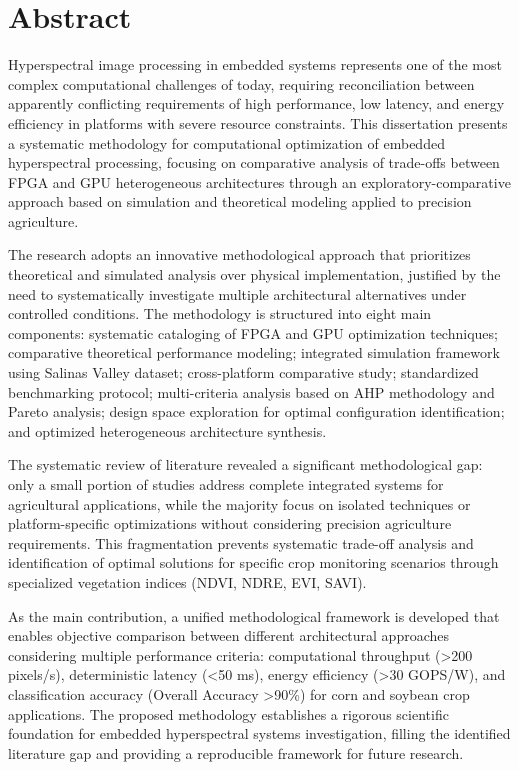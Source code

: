 
\chapter*{Abstract}

Hyperspectral image processing in embedded systems represents one of the most complex computational challenges of today, requiring reconciliation between apparently conflicting requirements of high performance, low latency, and energy efficiency in platforms with severe resource constraints. This dissertation presents a systematic methodology for computational optimization of embedded hyperspectral processing, focusing on comparative analysis of trade-offs between FPGA and GPU heterogeneous architectures through an exploratory-comparative approach based on simulation and theoretical modeling applied to precision agriculture.

The research adopts an innovative methodological approach that prioritizes theoretical and simulated analysis over physical implementation, justified by the need to systematically investigate multiple architectural alternatives under controlled conditions. The methodology is structured into eight main components: systematic cataloging of FPGA and GPU optimization techniques; comparative theoretical performance modeling; integrated simulation framework using Salinas Valley dataset; cross-platform comparative study; standardized benchmarking protocol; multi-criteria analysis based on AHP methodology and Pareto analysis; design space exploration for optimal configuration identification; and optimized heterogeneous architecture synthesis.

The systematic review of literature revealed a significant methodological gap: only a small portion of studies address complete integrated systems for agricultural applications, while the majority focus on isolated techniques or platform-specific optimizations without considering precision agriculture requirements. This fragmentation prevents systematic trade-off analysis and identification of optimal solutions for specific crop monitoring scenarios through specialized vegetation indices (NDVI, NDRE, EVI, SAVI).

As the main contribution, a unified methodological framework is developed that enables objective comparison between different architectural approaches considering multiple performance criteria: computational throughput (>200 pixels/s), deterministic latency (<50 ms), energy efficiency (>30 GOPS/W), and classification accuracy (Overall Accuracy >90\%) for corn and soybean crop applications. The proposed methodology establishes a rigorous scientific foundation for embedded hyperspectral systems investigation, filling the identified literature gap and providing a reproducible framework for future research.

